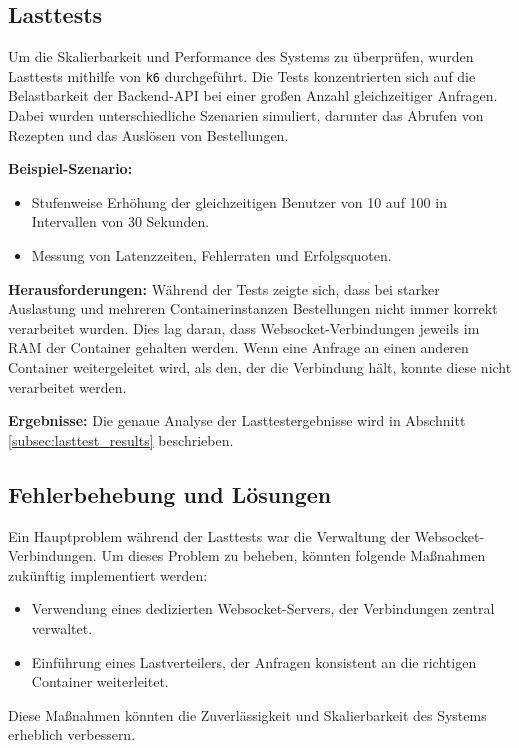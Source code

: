 \subsection{Lasttests}
\label{subsec:lasttests}

Um die Skalierbarkeit und Performance des Systems zu überprüfen, wurden Lasttests mithilfe von \texttt{k6} durchgeführt. Die Tests konzentrierten sich auf die Belastbarkeit der Backend-API bei einer großen Anzahl gleichzeitiger Anfragen. Dabei wurden unterschiedliche Szenarien simuliert, darunter das Abrufen von Rezepten und das Auslösen von Bestellungen.\newline

\textbf{Beispiel-Szenario:}
\begin{itemize}
  \item Stufenweise Erhöhung der gleichzeitigen Benutzer von 10 auf 100 in Intervallen von 30 Sekunden.
  \item Messung von Latenzzeiten, Fehlerraten und Erfolgsquoten.
\end{itemize}

\textbf{Herausforderungen:} Während der Tests zeigte sich, dass bei starker Auslastung und mehreren Containerinstanzen Bestellungen nicht immer korrekt verarbeitet wurden. Dies lag daran, dass Websocket-Verbindungen jeweils im RAM der Container gehalten werden. Wenn eine Anfrage an einen anderen Container weitergeleitet wird, als den, der die Verbindung hält, konnte diese nicht verarbeitet werden.\newline

\textbf{Ergebnisse:} Die genaue Analyse der Lasttestergebnisse wird in Abschnitt \ref{subsec:lasttest_results} beschrieben.

\subsection{Fehlerbehebung und Lösungen}

Ein Hauptproblem während der Lasttests war die Verwaltung der Websocket-Verbindungen. Um dieses Problem zu beheben, könnten folgende Maßnahmen zukünftig implementiert werden:

\begin{itemize}
  \item Verwendung eines dedizierten Websocket-Servers, der Verbindungen zentral verwaltet.
  \item Einführung eines Lastverteilers, der Anfragen konsistent an die richtigen Container weiterleitet.
\end{itemize}

Diese Maßnahmen könnten die Zuverlässigkeit und Skalierbarkeit des Systems erheblich verbessern.
